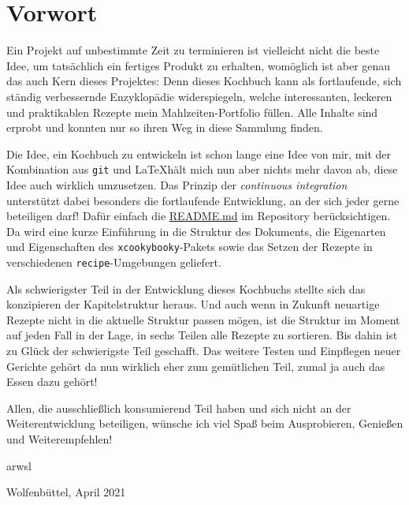 \thispagestyle{empty}
\setcounter{page}{0}

\section*{Vorwort}
\label{sec:Vorwort}

Ein Projekt auf unbestimmte Zeit zu terminieren ist vielleicht nicht die beste Idee, um tatsächlich ein fertiges Produkt zu erhalten, womöglich ist aber genau das auch Kern dieses Projektes: Denn dieses Kochbuch kann als fortlaufende, sich ständig verbessernde Enzyklopädie widerspiegeln, welche interessanten, leckeren und praktikablen Rezepte mein Mahlzeiten-Portfolio füllen. Alle Inhalte sind erprobt und konnten nur so ihren Weg in diese Sammlung finden.

Die Idee, ein Kochbuch zu entwickeln ist schon lange eine Idee von mir, mit der Kombination aus \texttt{git} und \LaTeX\:hält mich nun aber nichts mehr davon ab, diese Idee auch wirklich umzusetzen. Das Prinzip der \emph{continuous integration} unterstützt dabei besonders die fortlaufende Entwicklung, an der sich jeder gerne beteiligen darf! Dafür einfach die \href{https://github.com/arwsl/Bronte-Project}{README.md} im Repository berücksichtigen. Da wird eine kurze Einführung in die Struktur des Dokuments, die Eigenarten und Eigenschaften des \texttt{xcookybooky}-Pakets sowie das Setzen der Rezepte in verschiedenen \texttt{recipe}-Umgebungen geliefert.

Als schwierigster Teil in der Entwicklung dieses Kochbuchs stellte sich das konzipieren der Kapitelstruktur heraus. Und auch wenn in Zukunft neuartige Rezepte nicht in die aktuelle Struktur passen mögen, ist die Struktur im Moment auf jeden Fall in der Lage, in sechs Teilen alle Rezepte zu sortieren. Bis dahin ist zu Glück der schwierigste Teil geschafft. Das weitere Testen und Einpflegen neuer Gerichte gehört da nun wirklich eher zum gemütlichen Teil, zumal ja auch das Essen dazu gehört!

Allen, die ausschließlich konsumierend Teil haben und sich nicht an der Weiterentwicklung beteiligen, wünsche ich viel Spaß beim Ausprobieren, Genießen und Weiterempfehlen!

\vspace{1.5cm}
\hspace{1cm} arwsl
\begin{flushright}
	\hfill Wolfenbüttel, April 2021
\end{flushright}



\clearpage
